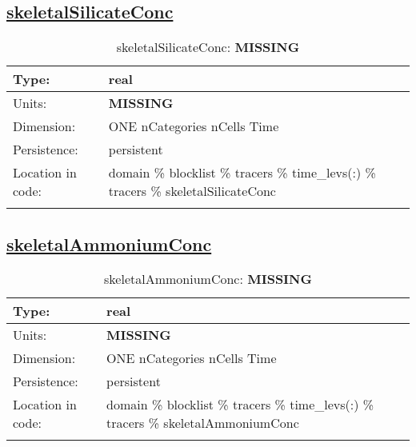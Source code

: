 \subsection[skeletalSilicateConc]{\hyperref[sec:var_tab_tracers]{skeletalSilicateConc}}
\label{subsec:var_sec_tracers_skeletalSilicateConc}
\begin{center}
\begin{longtable}{| p{2.0in} | p{4.0in} |}
        \hline 
        Type: & real \\
        \hline 
        Units: & {\bf \color{red} MISSING} \\
        \hline 
        Dimension: & ONE nCategories nCells Time \\
        \hline 
        Persistence: & persistent \\
        \hline 
         Location in code: & domain \% blocklist \% tracers \% time\_levs(:) \% tracers \% skeletalSilicateConc \\
         \hline 
    \caption{skeletalSilicateConc: {\bf \color{red} MISSING}}
\end{longtable}
\end{center}
\subsection[skeletalAmmoniumConc]{\hyperref[sec:var_tab_tracers]{skeletalAmmoniumConc}}
\label{subsec:var_sec_tracers_skeletalAmmoniumConc}
\begin{center}
\begin{longtable}{| p{2.0in} | p{4.0in} |}
        \hline 
        Type: & real \\
        \hline 
        Units: & {\bf \color{red} MISSING} \\
        \hline 
        Dimension: & ONE nCategories nCells Time \\
        \hline 
        Persistence: & persistent \\
        \hline 
         Location in code: & domain \% blocklist \% tracers \% time\_levs(:) \% tracers \% skeletalAmmoniumConc \\
         \hline 
    \caption{skeletalAmmoniumConc: {\bf \color{red} MISSING}}
\end{longtable}
\end{center}

